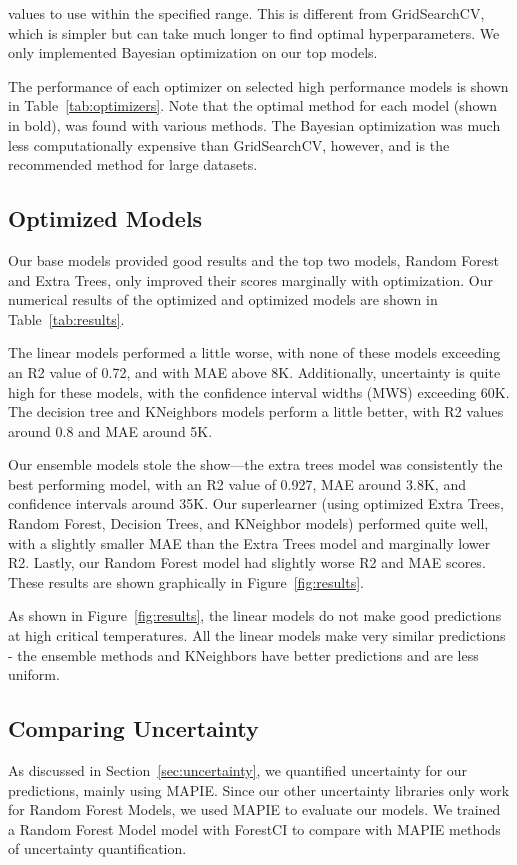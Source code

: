 \documentclass[twocolumn, nofootinbib, secnumarabic, amssymb, nobibnotes, aps, prd]{revtex4-2}
\begin{document}
\clearpage

\noindent
values to use within the specified range. This is different from GridSearchCV, which is simpler but can take much longer to find optimal hyperparameters. We only implemented Bayesian optimization on our top models.

The performance of each optimizer on selected high performance models is shown in Table~\ref{tab:optimizers}. Note that the optimal method for each model (shown in bold), was found with various methods. The Bayesian optimization was much less computationally expensive than GridSearchCV, however, and is the recommended method for large datasets.

\subsection{Optimized Models}\label{sec:optimized-models}

Our base models provided good results and the top two models, Random Forest and Extra Trees, only improved their scores marginally with optimization. Our numerical results of the optimized and optimized models are shown in Table~\ref{tab:results}.

The linear models performed a little worse, with none of these models exceeding an R2 value of 0.72, and with MAE above 8K. Additionally, uncertainty is quite high for these models, with the confidence interval widths (MWS) exceeding 60K. The decision tree and KNeighbors models perform a little better, with R2 values around 0.8 and MAE around 5K. 

Our ensemble models stole the show—the extra trees model was consistently the best performing model, with an R2 value of 0.927, MAE around 3.8K, and confidence intervals around 35K. Our superlearner (using optimized Extra Trees, Random Forest, Decision Trees, and KNeighbor models) performed quite well, with a slightly smaller MAE than the Extra Trees model and marginally lower R2. Lastly, our Random Forest model had slightly worse R2 and MAE scores. These results are shown graphically in Figure~\ref{fig:results}.

As shown in Figure~\ref{fig:results}, the linear models do not make good predictions at high critical temperatures. All the linear models make very similar predictions - the ensemble methods and KNeighbors have better predictions and are less uniform.

\subsection{Comparing Uncertainty}
As discussed in Section~\ref{sec:uncertainty}, we quantified uncertainty for our predictions, mainly using MAPIE. Since our other uncertainty libraries only work for Random Forest Models, we used MAPIE to evaluate our models. We trained a Random Forest Model model with ForestCI to compare with MAPIE methods of uncertainty quantification. 
\end{document}
